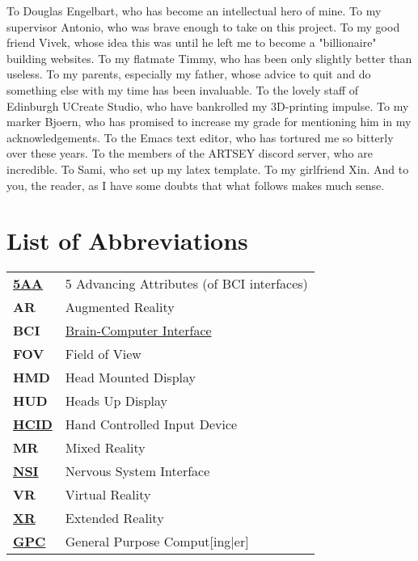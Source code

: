 \documentclass[logo,bsc,singlespacing,parskip]{infthesis}
\begin{document}
\begin{preliminary}
\begin{acknowledgements}
To Douglas Engelbart, who has become an intellectual hero of mine.
To my supervisor Antonio, who was brave enough to take on this project.
To my good friend Vivek, whose idea this was until he left me to become a "billionaire" building websites.
To my flatmate Timmy, who has been only slightly better than useless.
To my parents, especially my father, whose advice to quit and do something else with my time has been invaluable.
To the lovely staff of Edinburgh UCreate Studio, who have bankrolled my 3D-printing impulse.
To my marker Bjoern, who has promised to increase my grade for mentioning him in my acknowledgements.
To the Emacs text editor, who has tortured me so bitterly over these years.
To the members of the ARTSEY discord server, who are incredible.
To Sami, who set up my latex template.
To my girlfriend Xin.
And to you, the reader, as I have some doubts that what follows makes much sense.
\end{acknowledgements}

\iffalse %

\part{List of Abbreviations}
\label{sec:org91eae5e}
\fi
\chapter*{List of Abbreviations}
\label{sec:orgcf19e88}
\begin{center}
\begin{tabular}{ll}
\textbf{\hyperref[org7b75b93]{5AA}} & 5 Advancing Attributes (of BCI interfaces)\\
\textbf{AR} & Augmented Reality\\
\textbf{BCI} & \hyperref[org805b132]{Brain-Computer Interface}\\
\textbf{FOV} & Field of View\\
\textbf{HMD} & Head Mounted Display\\
\textbf{HUD} & Heads Up Display\\
\textbf{\hyperref[orgf95a76e]{HCID}} & Hand Controlled Input Device\\
\textbf{MR} & Mixed Reality\\
\textbf{\hyperref[org559faaa]{NSI}} & Nervous System Interface\\
\textbf{VR} & Virtual Reality\\
\textbf{\hyperref[org88b0f70]{XR}} & Extended Reality\\
\textbf{\hyperref[org5fbf4b0]{GPC}} & General Purpose Comput[ing\(\vert{}\)er]\\
\end{tabular}

\end{center}

\setcounter{tocdepth}{1}
\tableofcontents
{}
\listoffigures
\listoftables
\end{preliminary}
\end{document}
